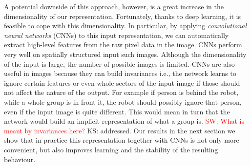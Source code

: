 \documentclass[letterpaper, 10 pt, conference]{ieeeconf}
\newcommand{\sw}[1]{\textcolor{red}{SW: #1}}
\newcommand{\ks}[1]{\textcolor{mypurp}{KS: #1}}
\begin{document}
A potential downside of this approach, however, is a great increase in the dimensionality of our representation.  Fortunately, thanks to deep learning, it is feasible to cope with this dimensionality.  In particular, by applying \emph{convolutional neural networks} (CNNs) to this input representation, we can automatically extract high-level features from the raw pixel data in the image. CNNs perform very well on spatially structured input such images.  Although the  dimensionality of the input is large, the number of possible images is limited. CNNs are also useful in images because they can build invariances i.e., the network learns to ignore certain features or even whole sectors of the input image if those should not affect the nature of the output. For example if person is behind the robot, while a whole group is in front it, the robot should possibly ignore that person, even if the input image is quite different. This would mean in turn that the network would build an implicit representation of what a group is. \sw{What is meant by invariances here?} \ks{addressed}. Our results in the next section we show that in practice this representation together with CNNs is not only more convenient, but also improves learning and the stability of the resulting behaviour.
\end{document}
